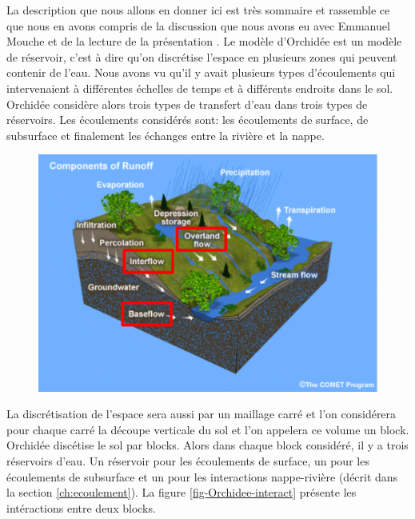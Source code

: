 \documentclass[a4paper,11pt]{article}
\numberwithin{equation}{section}
\begin{document}
La description que nous allons en donner ici est très sommaire et rassemble ce que nous en avons compris de la discussion que nous avons eu avec Emmanuel Mouche et de la lecture de la présentation \cite{gumiberteau2016}. Le modèle d'Orchidée est un modèle de réservoir, c'est à dire qu'on discrétise l'espace en plusieurs zones qui peuvent contenir de l'eau. Nous avons vu qu'il y avait plusieurs types d'écoulements qui intervenaient à différentes échelles de temps et à différents endroits dans le sol. Orchidée considère alors trois types de transfert d'eau dans trois types de réservoirs. Les écoulements considérés sont: les écoulements de surface, de subsurface et finalement les échanges entre la rivière et la nappe. 

\begin{figure}[H]
	\label{fig-HGS}
	\begin{center}
		\includegraphics[scale=0.3]{different_flows.png}
	\end{center}
\end{figure}

La discrétisation de l'espace sera aussi par un maillage carré et l'on considérera pour chaque carré la découpe verticale du sol et l'on appelera ce volume un block. Orchidée discétise le sol par blocks. Alors dans chaque block considéré, il y a trois réservoirs d'eau. Un réservoir pour les écoulements de surface, un pour les écoulements de subsurface et un pour les interactions nappe-rivière (décrit dans la section \ref{ch:ecoulement}). La figure \ref{fig-Orchidee-interact} présente les intéractions entre deux blocks.
\end{document}
